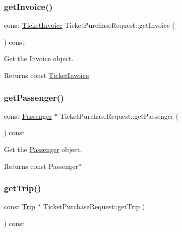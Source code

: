 \subsubsection{\texorpdfstring{get\+Invoice()}{getInvoice()}}
{\footnotesize\ttfamily const \mbox{\hyperlink{classTicketInvoice}{Ticket\+Invoice}} Ticket\+Purchase\+Request\+::get\+Invoice (\begin{DoxyParamCaption}{ }\end{DoxyParamCaption}) const}



Get the Invoice object. 

\begin{DoxyReturn}{Returns}
const \mbox{\hyperlink{classTicketInvoice}{Ticket\+Invoice}} 
\end{DoxyReturn}
\mbox{\label{classTicketPurchaseRequest_a08428a7617aa26c16702420e61ce0312}} 
\subsubsection{\texorpdfstring{get\+Passenger()}{getPassenger()}}
{\footnotesize\ttfamily const \mbox{\hyperlink{classPassenger}{Passenger}} $\ast$ Ticket\+Purchase\+Request\+::get\+Passenger (\begin{DoxyParamCaption}{ }\end{DoxyParamCaption}) const}



Get the \mbox{\hyperlink{classPassenger}{Passenger}} object. 

\begin{DoxyReturn}{Returns}
const Passenger$\ast$ 
\end{DoxyReturn}
\mbox{\label{classTicketPurchaseRequest_a7ae48dcccbcddb298fae1bd74048570b}} 
\subsubsection{\texorpdfstring{get\+Trip()}{getTrip()}}
{\footnotesize\ttfamily const \mbox{\hyperlink{classTrip}{Trip}} $\ast$ Ticket\+Purchase\+Request\+::get\+Trip (\begin{DoxyParamCaption}{ }\end{DoxyParamCaption}) const}



